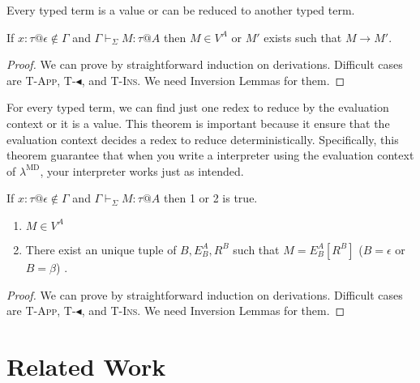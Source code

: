\documentclass[runningheads]{llncs}
\newcommand{\LMD}{$\lambda^{\textrm{MD}}$\xspace}
\newcommand{\G}{\Gamma}
\newcommand{\V}{\vdash_\Sigma}
\newcommand{\TBL}{\blacktriangleleft}
\newcommand{\TApp}{\textsc{T-App}}
\newcommand{\TTBL}{\textsc{T-$\TBL$}}
\newcommand{\TIns}{\textsc{T-Ins}}
\begin{document}
Every typed term is a value or can be reduced to another typed term.
\begin{theorem}[Progress]
	If $x:\tau @\epsilon \notin \G$ and $\G \V M : \tau  @ A$ then
	$ M \in V^A $ or $M'$ exists such that $M \longrightarrow M'$.
\end{theorem}

\begin{proof}
	We can prove by straightforward induction on derivations.
	Difficult cases are \TApp, \TTBL, and \TIns.
	We need Inversion Lemmas for them.
\end{proof}

For every typed term, we can find just one redex to reduce by the evaluation context or it is a value.
This theorem is important because it ensure 
that the evaluation context decides a redex to reduce deterministically.
Specifically, this theorem guarantee that 
when you write a interpreter using the evaluation context of \LMD,
your interpreter works just as intended.

\begin{theorem}
	If $x:\tau@\epsilon \notin \G$ and $\G \V M : \tau @ A$ then 1 or 2 is true.
	\begin{enumerate}
		\item $ M \in V^A$
		\item There exist an unique tuple of $B, E^A_B, R^B$ such that $M = E^A_B[R^B]$ ($B = \epsilon$ or $B = \beta$) .
	\end{enumerate}
\end{theorem}

\begin{proof}
	We can prove by straightforward induction on derivations.
	Difficult cases are \TApp, \TTBL, and \TIns.
	We need Inversion Lemmas for them.
\end{proof}

\section{Related Work}
\end{document}
